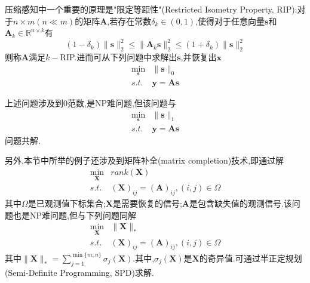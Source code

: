 压缩感知中一个重要的原理是"限定等距性"(Restricted Isometry Property, RIP):对于$n\times m(n\ll m)$的矩阵$\mathbf{A}$,若存在常数$\delta_k\in(0,1)$,使得对于任意向量$\mathbf{s}$和$\mathbf{A}_k\in\mathbb{R}^{n\times k}$有
\begin{equation}
(1-\delta_k)\|\mathbf{s}\|_2^2\le \|\mathbf{A}_k\mathbf{s}\|_2^2\le (1+\delta_k)\|\mathbf{s}\|_2^2
\end{equation}
则称$\mathbf{A}$满足$k-$RIP.进而可从下列问题中求解出$\mathbf{s}$,并恢复出$\mathbf{x}$
\begin{equation}
\begin{split}\min_{\mathbf{s}}&\|\mathbf{s}\|_0\\
s.t.& \mathbf{y=As}\end{split}
\end{equation}

上述问题涉及到$0$范数,是NP难问题,但该问题与
\begin{equation}
\begin{split}\min_{\mathbf{s}}&\|\mathbf{s}\|_1\\
s.t.& \mathbf{y=As}\end{split}
\end{equation}
问题共解.

另外,本节中所举的例子还涉及到矩阵补全(matrix completion)技术,即通过解
\begin{equation}
\begin{split}
\min_{\mathbf{X}}&rank(\mathbf{X})\\
s.t.&(\mathbf{X})_{ij}=(\mathbf{A})_{ij},(i,j)\in\Omega
\end{split}
\end{equation}
其中$\Omega$是已观测值下标集合;$\mathbf{X}$是需要恢复的信号;$\mathbf{A}$是包含缺失值的观测信号.该问题也是NP难问题,但与下列问题同解
\begin{equation}
\begin{split}
\min_{\mathbf{X}}&\|\mathbf{X}\|_{\ast}\\
s.t.&(\mathbf{X})_{ij}=(\mathbf{A})_{ij},(i,j)\in\Omega
\end{split}
\end{equation}
其中$\|\mathbf{X}\|_{\ast}=\sum_{j=1}^{\min\{m,n\}}\sigma_j(\mathbf{X})$.其中,$\sigma_j(\mathbf{X})$是$\mathbf{X}$的奇异值.可通过半正定规划(Semi-Definite Programming, SPD)求解.